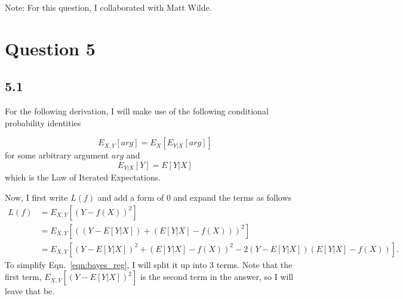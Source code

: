 \documentclass[12pt]{amsart}
\begin{document}
Note: For this question, I collaborated with Matt Wilde.


\section*{Question 5}

\subsection*{5.1}

For the following derivation, I will make use of the following conditional probability identities

\begin{equation} \label{eqn:exp_rule_1}
E_{X,Y}[arg] = E_{X}[E_{Y|X}[arg]]
\end{equation}
for some arbitrary argument $arg$ and 
\begin{equation} \label{eqn:exp_rule_2}
E_{Y|X}[Y] = E[Y|X]
\end{equation}
which is the Law of Iterated Expectations.

Now, I first write $L(f)$ and add a form of 0 and expand the terms as follows
\begin{equation} \label{eqn:bayes_reg}
\begin{split}
L(f) & = E_{X,Y}[(Y - f(X))^2] \\
& = E_{X,Y}[((Y - E[Y|X]) + (E[Y|X] - f(X)))^2] \\
& = E_{X,Y}[(Y - E[Y|X])^2 + (E[Y|X] - f(X))^2 - 2(Y - E[Y|X])(E[Y|X] - f(X))] .
\end{split}
\end{equation}
To simplify Eqn.~\ref{eqn:bayes_reg}, I will split it up into 3 terms.  Note that the first term, $E_{X,Y}[(Y - E[Y|X])^2]$ is the second term in the answer, so I will leave that be.  
\end{document}
